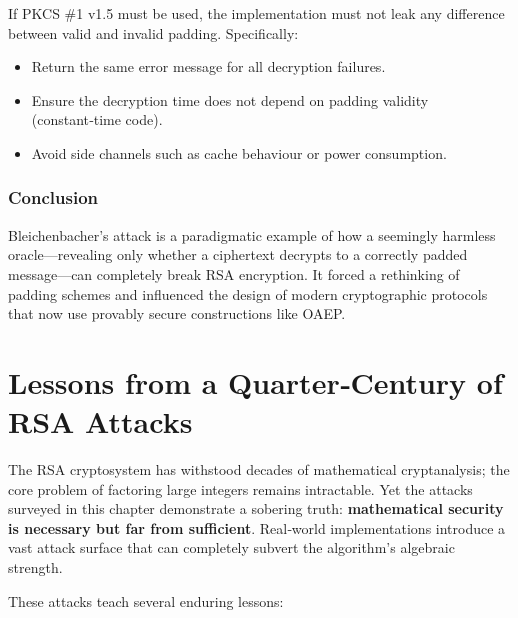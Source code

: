 If PKCS \#1 v1.5 must be used, the implementation must not leak any difference between valid and invalid padding. Specifically:
\begin{itemize}
    \item Return the same error message for all decryption failures.
    \item Ensure the decryption time does not depend on padding validity (constant‑time code).
    \item Avoid side channels such as cache behaviour or power consumption.
\end{itemize}

\subsubsection*{Conclusion}

Bleichenbacher's attack is a paradigmatic example of how a seemingly harmless oracle—revealing only whether a ciphertext decrypts to a correctly padded message—can completely break RSA encryption. It forced a rethinking of padding schemes and influenced the design of modern cryptographic protocols that now use provably secure constructions like OAEP.

\section{Lessons from a Quarter‑Century of RSA Attacks}

The RSA cryptosystem has withstood decades of mathematical cryptanalysis; the core problem of factoring large integers remains intractable. Yet the attacks surveyed in this chapter demonstrate a sobering truth: \textbf{mathematical security is necessary but far from sufficient}. Real‑world implementations introduce a vast attack surface that can completely subvert the algorithm's algebraic strength.

These attacks teach several enduring lessons:

